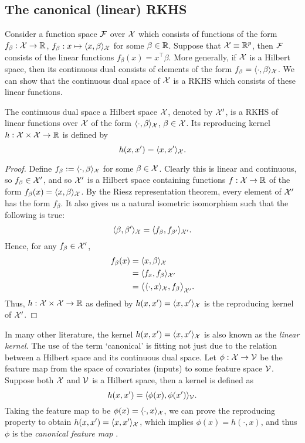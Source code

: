 \documentclass[a4paper,showframe,11pt,draft]{report}
\begin{document}
\subsection{The canonical (linear) RKHS}

Consider a function space ${\mathcal F}$ over ${\mathcal X}$ which consists of functions of the form $f_\beta:{\mathcal X}\to\mathbb{R}$, $f_\beta: x \mapsto \langle x,\beta\rangle_{\mathcal X}$ for some $\beta\in\mathbb{R}$.
Suppose that ${\mathcal X} \equiv \mathbb{R}^p$, then ${\mathcal F}$ consists of the linear functions $f_\beta(x) = x^\top\beta$.
More generally, if ${\mathcal X}$ is a Hilbert space, then its continuous dual consists of elements of the form $f_\beta = \langle\cdot,\beta\rangle_{\mathcal X}$.
We can show that the continuous dual space of ${\mathcal X}$ is a RKHS which consists of these linear functions.

\begin{proposition}
  The continuous dual space a Hilbert space ${\mathcal X}$, denoted by ${\mathcal X}'$, is a RKHS of linear functions over ${\mathcal X}$ of the form $\langle\cdot,\beta\rangle_{\mathcal X}$, $\beta\in{\mathcal X}$. Its reproducing kernel $h:{\mathcal X}\times{\mathcal X}\to\mathbb{R}$ is defined by
  \[
    h(x,x') = \langle x,x'\rangle_{{\mathcal X}}.
  \]
\end{proposition}

\begin{proof}
  Define $f_\beta := \langle\cdot,\beta\rangle_{\mathcal X}$ for some $\beta \in {\mathcal X}$.
  Clearly this is linear and continuous, so $f_\beta\in{\mathcal X}'$, and so ${\mathcal X}'$ is a Hilbert space containing functions $f:{\mathcal X}\to\mathbb{R}$ of the form $f_\beta(x) = \langle x,\beta\rangle_{\mathcal X}$.
  By the Riesz representation theorem, every element of ${\mathcal X}'$ has the form $f_\beta$.
  It also gives us a natural isometric isomorphism such that the following is true:
  \[
    \langle\beta,\beta'\rangle_{\mathcal X} = \langle f_\beta,f_{\beta'}\rangle_{{\mathcal X}'}.
  \]
  Hence, for any $f_\beta\in{\mathcal X}'$, 
  \begin{align*}
    f_\beta(x) 
    &= \langle x,\beta\rangle_{\mathcal X} \\
    &= \langle f_x,f_{\beta}\rangle_{{\mathcal X}'} \\
    &= \big\langle \langle\cdot,x\rangle_{\mathcal X},f_{\beta} \big\rangle_{{\mathcal X}'}.
  \end{align*}
  Thus, $h:{\mathcal X}\times{\mathcal X}\to\mathbb{R}$ as defined by $h(x,x') = \langle x,x'\rangle_{\mathcal X}$ is the reproducing kernel of ${\mathcal X}'$.
\end{proof}

In many other literature, the kernel $h(x,x') = \langle x,x'\rangle_{\mathcal X}$ is also known as the \emph{linear kernel}.
The use of the term `canonical' is fitting not just due to the relation between a Hilbert space and its continuous dual space.
Let $\phi:{\mathcal X}\to{\mathcal V}$ be the feature map from the space of covariates (inputs) to some feature space ${\mathcal V}$.
Suppose both ${\mathcal X}$ and ${\mathcal V}$ is a Hilbert space, then a kernel is defined as 
\[
  h(x,x') = \langle\phi(x),\phi(x')\rangle_{\mathcal V}.
\]
Taking the feature map to be $\phi(x) = \langle\cdot,x\rangle_{\mathcal X}$, we can prove the reproducing property to obtain $h(x,x') = \langle x,x'\rangle_{\mathcal X}$, which implies $\phi(x) = h(\cdot,x)$, and thus $\phi$ is the \emph{canonical feature map} \citep[Lemma 4.19]{steinwart2008support}.
\end{document}
